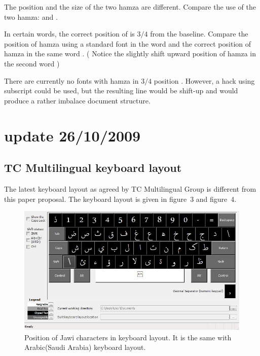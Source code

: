 \documentclass[12pt,a4paper]{IEEEconf}
\begin{document}
The position and the size of the two hamza are different.
Compare the use of the two hamza: 
and .

In certain words, the correct position of  is $3/4$ from the baseline. Compare the position of hamza using a standard font in the word  and the correct position of hamza in the same word  . ( Notice the slightly shift upward position of hamza in the second word )

There are currently no fonts with hamza in $3/4$ position . However, a hack using subscript could be used, but the resulting line would be shift-up and would produce a rather imbalace document structure.

\section{update 26/10/2009}

\subsection{TC Multilingual keyboard layout}
The latest keyboard layout as agreed by TC Multilingual Group is different from this paper proposal. The keyboard layout is given in figure~3 and figure~4.

\begin{center}
\begin{figure}[th] \label{fig:jawi1}
\caption{Position of Jawi characters in keyboard layout. It is the same with Arabic(Saudi Arabia) keyboard layout.}
\includegraphics[width=\columnwidth]{arabjawi.jpg}
\end{figure}
\end{center}
\end{document}
